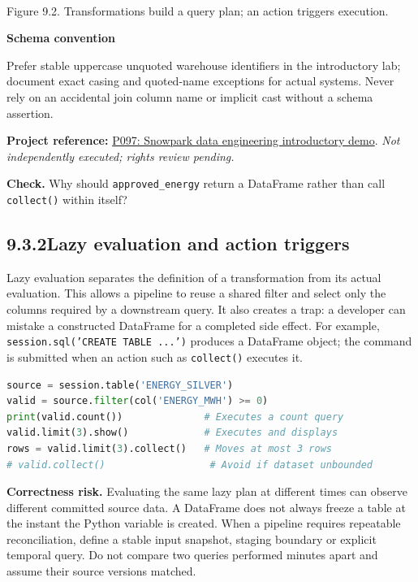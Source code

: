 \documentclass[11pt,twoside]{article}
\newcommand{\topic}[2]{\subsection*{#1\quad #2}}
\newcommand{\repo}[2]{\par\begingroup\fontsize{8.0}{9.6}\selectfont\sffamily\color{inkgray}\textbf{Project reference:} \href{#2}{#1}. \textit{Not independently executed; rights review pending.}\par\endgroup}
\begin{document}
\begin{center}\\{\fontsize{8}{9.5}\selectfont\color{inkgray}Figure 9.2. Transformations build a query plan; an action triggers execution.}\end{center}
\begin{whitebox}\textbf{Schema convention}\par
Prefer stable uppercase unquoted warehouse identifiers in the introductory lab; document exact casing and quoted-name exceptions for actual systems. Never rely on an accidental join column name or implicit cast without a schema assertion.\end{whitebox}
\repo{P097: Snowpark data engineering introductory demo}{https://github.com/Snowflake-Labs/sfguide-data-engineering-with-snowpark-python-intro}
\textbf{Check.} Why should \texttt{approved\_energy} return a DataFrame rather than call \texttt{collect()} within itself?
\newpage
\topic{9.3.2}{Lazy evaluation and action triggers}
Lazy evaluation separates the definition of a transformation from its actual evaluation. This allows a pipeline to reuse a shared filter and select only the columns required by a downstream query. It also creates a trap: a developer can mistake a constructed DataFrame for a completed side effect. For example, \texttt{session.sql('CREATE TABLE ...')} produces a DataFrame object; the command is submitted when an action such as \texttt{collect()} executes it.
\begin{lstlisting}[language=Python,caption={Actions are deliberate execution boundaries.}]
source = session.table('ENERGY_SILVER')
valid = source.filter(col('ENERGY_MWH') >= 0)
print(valid.count())              # Executes a count query
valid.limit(3).show()             # Executes and displays
rows = valid.limit(3).collect()   # Moves at most 3 rows
# valid.collect()                  # Avoid if dataset unbounded
\end{lstlisting}
\textbf{Correctness risk.} Evaluating the same lazy plan at different times can observe different committed source data. A DataFrame does not always freeze a table at the instant the Python variable is created. When a pipeline requires repeatable reconciliation, define a stable input snapshot, staging boundary or explicit temporal query. Do not compare two queries performed minutes apart and assume their source versions matched.
\end{document}
